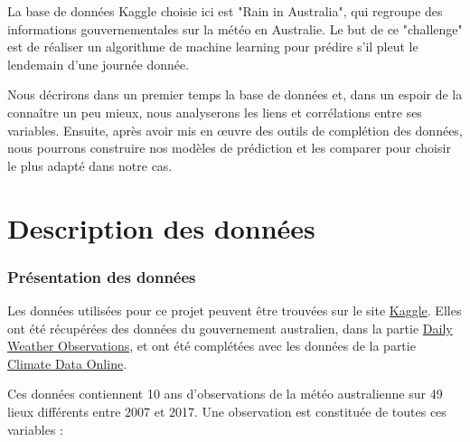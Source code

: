 \documentclass{article}
\begin{document}
La base de données Kaggle choisie ici est "Rain in Australia", qui regroupe des informations gouvernementales sur la météo en Australie. Le but de ce "challenge" est de réaliser un algorithme de machine learning pour prédire s'il pleut le lendemain d'une journée donnée. 

Nous décrirons dans un premier temps la base de données et, dans un espoir de la connaître un peu mieux, nous analyserons les liens et corrélations entre ses variables. Ensuite, après avoir mis en œuvre des outils de complétion des données, nous pourrons construire nos modèles de prédiction et les comparer pour choisir le plus adapté dans notre cas. 

\newpage
\part{Description des données}

\section{Présentation des données}

Les données utilisées pour ce projet peuvent être trouvées sur le site \href{https://www.kaggle.com/jsphyg/weather-dataset-rattle-package}{Kaggle}. Elles ont été récupérées des données du gouvernement australien, dans la partie \href{http://www.bom.gov.au/climate/dwo}{Daily Weather Observations}, et ont été complétées avec les données de la partie  \href{http://www.bom.gov.au/climate/data}{Climate Data Online}.

Ces données contiennent 10 ans d'observations de la météo australienne sur 49 lieux différents entre 2007 et 2017. Une observation est constituée de toutes ces variables : 
\end{document}
